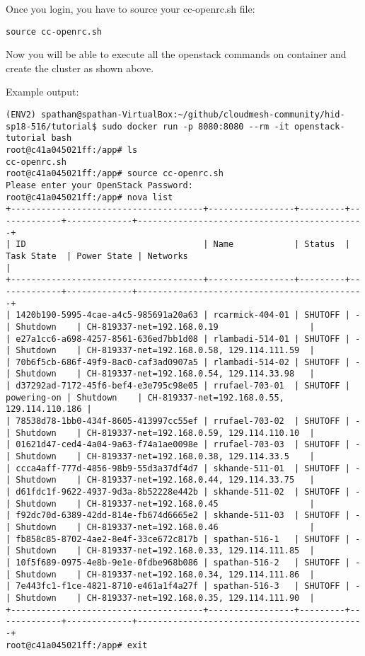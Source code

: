 Once you login, you have to source your cc-openrc.sh file:

\texttt{source\ cc-openrc.sh}

Now you will be able to execute all the openstack commands on container
and create the cluster as shown above.

Example output:

\begin{lstlisting}
(ENV2) spathan@spathan-VirtualBox:~/github/cloudmesh-community/hid-sp18-516/tutorial$ sudo docker run -p 8080:8080 --rm -it openstack-tutorial bash
root@c41a045021ff:/app# ls
cc-openrc.sh
root@c41a045021ff:/app# source cc-openrc.sh 
Please enter your OpenStack Password: 
root@c41a045021ff:/app# nova list
+--------------------------------------+-----------------+---------+-------------+-------------+---------------------------------------------+
| ID                                   | Name            | Status  | Task State  | Power State | Networks                                    |
+--------------------------------------+-----------------+---------+-------------+-------------+---------------------------------------------+
| 1420b190-5995-4cae-a4c5-985691a20a63 | rcarmick-404-01 | SHUTOFF | -           | Shutdown    | CH-819337-net=192.168.0.19                  |
| e27a1cc6-a698-4257-8561-636ed7bb1d08 | rlambadi-514-01 | SHUTOFF | -           | Shutdown    | CH-819337-net=192.168.0.58, 129.114.111.59  |
| 70b6f5cb-686f-49f9-8ac0-caf3ad0907a5 | rlambadi-514-02 | SHUTOFF | -           | Shutdown    | CH-819337-net=192.168.0.54, 129.114.33.98   |
| d37292ad-7172-45f6-bef4-e3e795c98e05 | rrufael-703-01  | SHUTOFF | powering-on | Shutdown    | CH-819337-net=192.168.0.55, 129.114.110.186 |
| 78538d78-1bb0-434f-8605-413997cc55ef | rrufael-703-02  | SHUTOFF | -           | Shutdown    | CH-819337-net=192.168.0.59, 129.114.110.10  |
| 01621d47-ced4-4a04-9a63-f74a1ae0098e | rrufael-703-03  | SHUTOFF | -           | Shutdown    | CH-819337-net=192.168.0.38, 129.114.33.5    |
| ccca4aff-777d-4856-98b9-55d3a37df4d7 | skhande-511-01  | SHUTOFF | -           | Shutdown    | CH-819337-net=192.168.0.44, 129.114.33.75   |
| d61fdc1f-9622-4937-9d3a-8b52228e442b | skhande-511-02  | SHUTOFF | -           | Shutdown    | CH-819337-net=192.168.0.45                  |
| f92dc70d-6389-42dd-814e-fb674d6665e2 | skhande-511-03  | SHUTOFF | -           | Shutdown    | CH-819337-net=192.168.0.46                  |
| fb858c85-8702-4ae2-8e4f-33ce672c817b | spathan-516-1   | SHUTOFF | -           | Shutdown    | CH-819337-net=192.168.0.33, 129.114.111.85  |
| 10f5f689-0975-4e8b-9e1e-0fdbe968b086 | spathan-516-2   | SHUTOFF | -           | Shutdown    | CH-819337-net=192.168.0.34, 129.114.111.86  |
| 7e443fc1-f1ce-4821-8710-e461a1f4a27f | spathan-516-3   | SHUTOFF | -           | Shutdown    | CH-819337-net=192.168.0.35, 129.114.111.90  |
+--------------------------------------+-----------------+---------+-------------+-------------+---------------------------------------------+
root@c41a045021ff:/app# exit
\end{lstlisting}

